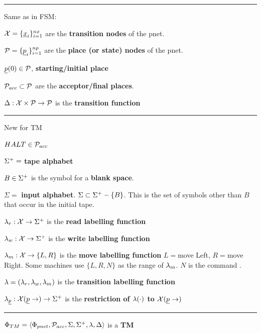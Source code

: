 \hrule
Same as in FSM:

$\calx =\{\rvx_i\}_{i=1}^{nx}$ are the {\bf transition nodes} of the pnet.

$\calp =\{\rvp_i\}_{i=1}^{np}$ are the {\bf place (or state) nodes} of the pnet.

$\rvp(0)\in \calp$, {\bf starting/initial place }

${\cal P}_{acc}\subset {\cal P}$ are the 
{\bf acceptor/final places}. 

$\Delta:{\cal X}\times{\cal P}\rightarrow {\cal P}$ is the 
{\bf transition function}
\hrule
New for TM

$HALT\in {\cal P}_{acc}$

$\Sigma^+ =$ {\bf tape alphabet}

$B\in \Sigma^+$ is the  symbol for a {\bf blank space}.

$\Sigma=$ {\bf input alphabet}. $\Sigma\subset\Sigma^+-\{B\}$. 
This is the set of symbols other than $B$ that occur in the 
initial tape.

$\lambda_{r}:{\cal X}\rightarrow \Sigma^+$ is the {\bf read  labelling function}

$\lambda_{w}:{\cal X}\rightarrow \Sigma^+$ is the {\bf write  labelling function}

$\lambda_{m}:{\cal X}\rightarrow \{L,R\}$ is the {\bf move 
labelling function} $L=$move Left, $R=$move Right. Some machines use $\{L,R,N\}$
as the range of $\lambda_m$. $N$ is the command .

$\lambda = (\lambda_r, \lambda_w, \lambda_m)$ is the
{\bf transition labelling function}

$\lam_\rvp: \calx(\rvp\rarrow)\rarrow \TA$ is the
{\bf restriction of $\lambda(\cdot)$ to $\calx(\rvp\rarrow)$}

\hrule
$\Phi_{TM}=\left\langle\Phi_{pnet},{\cal P}_{acc}, \Sigma,
\Sigma^+, \lambda, \Delta\right\rangle$  is a {\bf TM}



